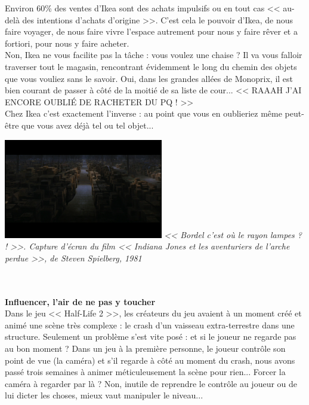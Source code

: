 \documentclass[11pt,twoside,a4paper]{article}
\begin{document}
\begin{minipage}[ht]{0.65\textwidth}
	Environ 60\% des ventes d'Ikea sont des achats impulsifs ou en tout cas << au-del{\`a} des intentions d'achats d'origine >>. C'est cela le pouvoir d'Ikea, de nous faire voyager, de nous faire vivre l'espace autrement pour nous y faire r{\^e}ver et a fortiori, pour nous y faire acheter.~\\

	Non, Ikea ne vous facilite pas la t{\^a}che : vous voulez une chaise ? Il va vous falloir traverser tout le magasin, rencontrant {\'e}videmment le long du chemin des objets que vous vouliez sans le savoir. Oui, dans les grandes all{\'e}es de Monoprix, il est bien courant de passer {\`a} c{\^o}t{\'e} de la moiti{\'e} de sa liste de cour... << RAAAH J'AI ENCORE OUBLI{\'E} DE RACHETER DU PQ ! >>~\\

	Chez Ikea c'est exactement l'inverse : au point que vous en oublieriez m{\^e}me peut-{\^e}tre que vous avez d{\'e}j{\`a} tel ou tel objet...~\\
\end{minipage} \hfill \begin{minipage}[ht]{7.00cm}
	\includegraphics[width=6.95cm]{img/raiders_of_the_lost_ark.png}
	\emph{\footnotesize << Bordel c'est o{\`u} le rayon lampes ? ! >>. Capture d'{\'e}cran du film << Indiana Jones et les aventuriers de l'arche perdue >>, de Steven Spielberg, 1981}~\\
\end{minipage}~\\~\\

\textbf{\large Influencer, l'air de ne pas y toucher}~\\

Dans le jeu << Half-Life 2 >>, les cr{\'e}ateurs du jeu avaient {\`a} un moment cr{\'e}{\'e} et anim{\'e} une sc{\`e}ne tr{\`e}s complexe : le crash d'un vaisseau extra-terrestre dans une structure. Seulement un probl{\`e}me s'est vite pos{\'e} : et si le joueur ne regarde pas au bon moment ? Dans un jeu {\`a} la premi{\`e}re personne, le joueur contr{\^o}le son point de vue (la cam{\'e}ra) et s'il regarde {\`a} c{\^o}t{\'e} au moment du crash, nous avons pass{\'e} trois semaines {\`a} animer m{\'e}ticuleusement la sc{\`e}ne pour rien... Forcer la cam{\'e}ra {\`a} regarder par l{\`a} ? Non, inutile de reprendre le contr{\^o}le au joueur ou de lui dicter les choses, mieux vaut manipuler le niveau...~\\
\end{document}
